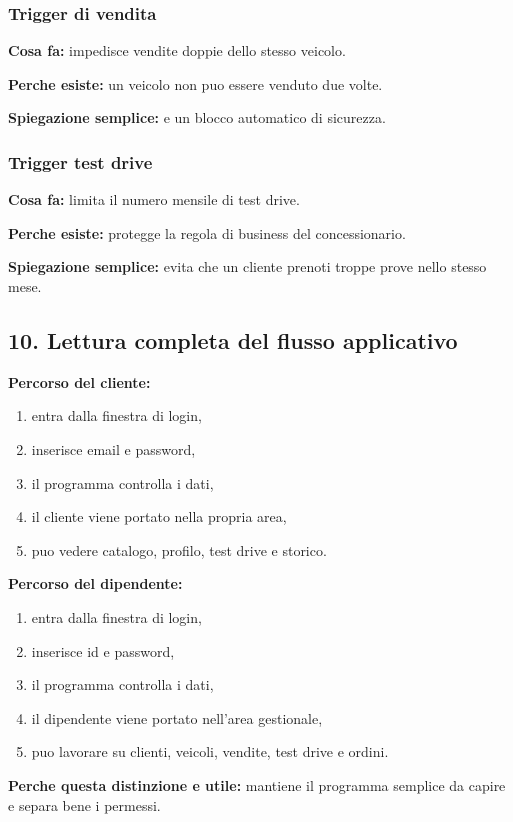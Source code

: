 \documentclass[12pt,a4paper]{article}
\begin{document}
\subsubsection*{Trigger di vendita}
\textbf{Cosa fa:} impedisce vendite doppie dello stesso veicolo.

\textbf{Perche esiste:} un veicolo non puo essere venduto due volte.

\textbf{Spiegazione semplice:} e un blocco automatico di sicurezza.

\subsubsection*{Trigger test drive}
\textbf{Cosa fa:} limita il numero mensile di test drive.

\textbf{Perche esiste:} protegge la regola di business del concessionario.

\textbf{Spiegazione semplice:} evita che un cliente prenoti troppe prove nello stesso mese.

\subsection{10. Lettura completa del flusso applicativo}

\textbf{Percorso del cliente:}
\begin{enumerate}
  \item entra dalla finestra di login,
  \item inserisce email e password,
  \item il programma controlla i dati,
  \item il cliente viene portato nella propria area,
  \item puo vedere catalogo, profilo, test drive e storico.
\end{enumerate}

\textbf{Percorso del dipendente:}
\begin{enumerate}
  \item entra dalla finestra di login,
  \item inserisce id e password,
  \item il programma controlla i dati,
  \item il dipendente viene portato nell'area gestionale,
  \item puo lavorare su clienti, veicoli, vendite, test drive e ordini.
\end{enumerate}

\textbf{Perche questa distinzione e utile:}
mantiene il programma semplice da capire e separa bene i permessi.
\end{document}

